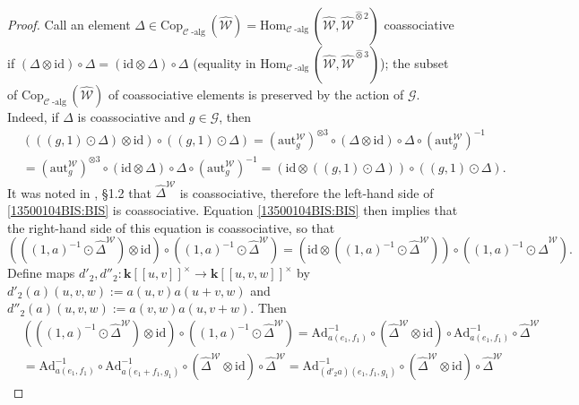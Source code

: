 \documentclass[10pt]{amsart}
\numberwithin{equation}{subsection}
\begin{document}
\begin{proof}
Call an element $\Delta\in\mathrm{Cop}_{\mathcal C\operatorname{-alg}}(\hat{\mathcal W})
=\mathrm{Hom}_{\mathcal C\operatorname{-alg}}(\hat{\mathcal W},
\hat{\mathcal W}^{\hat\otimes2})$ coassociative if $(\Delta\otimes \mathrm{id})\circ\Delta
=(\mathrm{id}\otimes\Delta)\circ\Delta$ (equality in 
$\mathrm{Hom}_{\mathcal C\operatorname{-alg}}(\hat{\mathcal W},
\hat{\mathcal W}^{\hat\otimes3})$); 
the subset of $\mathrm{Cop}_{\mathcal C\operatorname{-alg}}(\hat{\mathcal W})$ 
of coassociative elements is preserved by the action of $\mathcal G$. 
Indeed, if $\Delta$ is coassociative and $g\in\mathcal G$, then 
\begin{align*}
& (((g,1)\odot\Delta)\otimes\mathrm{id})\circ ((g,1)\odot\Delta)
=(\mathrm{aut}_g^{\mathcal W})^{\otimes 3}\circ (\Delta\otimes\mathrm{id})\circ\Delta\circ
(\mathrm{aut}_g^{\mathcal W})^{-1}
\\ & 
=(\mathrm{aut}_g^{\mathcal W})^{\otimes 3}\circ (\mathrm{id}\otimes\Delta)\circ\Delta\circ
(\mathrm{aut}_g^{\mathcal W})^{-1}
=(\mathrm{id}\otimes ((g,1)\odot\Delta))\circ ((g,1)\odot\Delta). 
\end{align*}
It was noted in \cite{EF1}, \S1.2 that $\hat\Delta^{\mathcal W}$ is coassociative, 
therefore the left-hand side of \eqref{13500104BIS:BIS} is coassociative. 
Equation \eqref{13500104BIS:BIS} then implies that the right-hand side of this equation is coassociative, so that 
\begin{equation}\label{eq:coass:a:Delta:BIS}
(((1,a)^{-1}\odot\hat\Delta^{\mathcal W})\otimes\mathrm{id})\circ ((1,a)^{-1}\odot\hat\Delta^{\mathcal W})
=(\mathrm{id}\otimes((1,a)^{-1}\odot\hat\Delta^{\mathcal W}))\circ ((1,a)^{-1}\odot\hat\Delta^{\mathcal W}). 
\end{equation}
Define maps $d'_2,d''_2 :\mathbf k[[u,v]]^\times\to\mathbf k[[u,v,w]]^\times$ by  $d'_2(a)(u,v,w):=a(u,v)a(u+v,w)$ and $d''_2(a)(u,v,w):=a(v,w)a(u,v+w)$. 
Then 
\begin{align*}
&(((1,a)^{-1}\odot\hat\Delta^{\mathcal W})\otimes\mathrm{id})\circ ((1,a)^{-1}\odot\hat\Delta^{\mathcal W})
=\mathrm{Ad}^{-1}_{a(e_1,f_1)} \circ (\hat\Delta^{\mathcal W}\otimes\mathrm{id}) \circ
\mathrm{Ad}^{-1}_{a(e_1,f_1)} \circ \hat\Delta^{\mathcal W}
\\ &
=
\mathrm{Ad}^{-1}_{a(e_1,f_1)}\circ\mathrm{Ad}^{-1}_{a(e_1+f_1,g_1)} \circ 
(\hat\Delta^{\mathcal W}\otimes\mathrm{id})  \circ \hat\Delta^{\mathcal W}
=
\mathrm{Ad}^{-1}_{(d'_2a)(e_1,f_1,g_1)}\circ 
(\hat\Delta^{\mathcal W}\otimes\mathrm{id})  \circ \hat\Delta^{\mathcal W}
\end{align*}

\end{proof}
\end{document}
